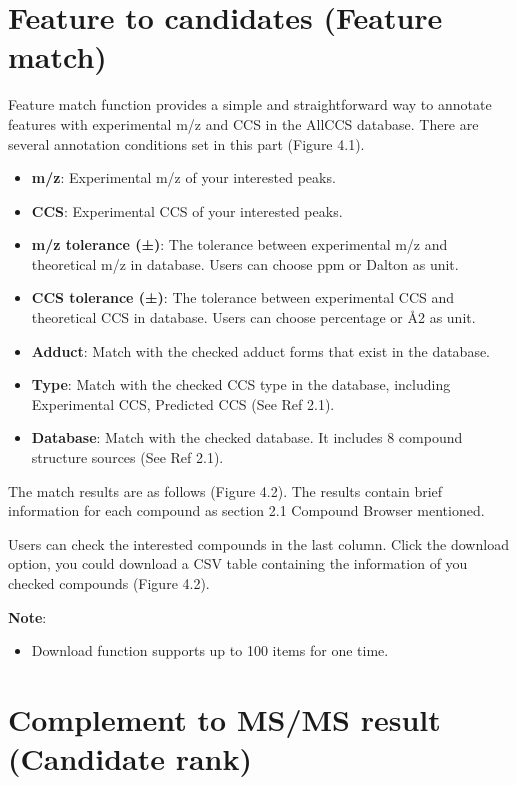 \documentclass[12pt,]{book}
\providecommand{\tightlist}{%
  \setlength{\itemsep}{0pt}\setlength{\parskip}{0pt}}
\theoremstyle{definition}
\theoremstyle{definition}
\theoremstyle{definition}
\theoremstyle{remark}
\begin{document}
\section{Feature to candidates (Feature
match)}\label{feature-to-candidates-feature-match}

Feature match function provides a simple and straightforward way to
annotate features with experimental m/z and CCS in the AllCCS database.
There are several annotation conditions set in this part (Figure 4.1).

\begin{itemize}
\tightlist
\item
  \textbf{m/z}: Experimental m/z of your interested peaks.
\item
  \textbf{CCS}: Experimental CCS of your interested peaks.
\item
  \textbf{m/z tolerance (±)}: The tolerance between experimental m/z and
  theoretical m/z in database. Users can choose ppm or Dalton as unit.
\item
  \textbf{CCS tolerance (±)}: The tolerance between experimental CCS and
  theoretical CCS in database. Users can choose percentage or Å2 as
  unit.
\item
  \textbf{Adduct}: Match with the checked adduct forms that exist in the
  database.
\item
  \textbf{Type}: Match with the checked CCS type in the database,
  including Experimental CCS, Predicted CCS (See Ref 2.1).
\item
  \textbf{Database}: Match with the checked database. It includes 8
  compound structure sources (See Ref 2.1).
\end{itemize}

The match results are as follows (Figure 4.2). The results contain brief
information for each compound as section 2.1 Compound Browser mentioned.

Users can check the interested compounds in the last column. Click the
download option, you could download a CSV table containing the
information of you checked compounds (Figure 4.2).

\textbf{Note}:

\begin{itemize}
\tightlist
\item
  Download function supports up to 100 items for one time.
\end{itemize}

\section{Complement to MS/MS result (Candidate
rank)}\label{complement-to-msms-result-candidate-rank}
\end{document}
